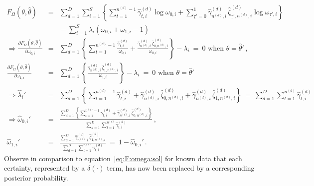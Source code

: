 \documentclass[a4paper]{article}
\newcommand{\ut}{\underline{\tau}}
\begin{document}
\begin{eqnarray}
  F_{\Omega}(\theta,\hat{\theta}) & = & 
\sum_{d=1}^D\sum_{i=1}^{S}\left\{
\sum_{t=1}^{n^{(d)}-1}
\hat{\gamma}_{t,i}^{(d)}\log\omega_{0,i}+
\sum_{\ut'=0}^{1}
\hat{\gamma}^{(d)}_{n^{(d)},i}\,\hat{\zeta}_{\ut',n^{(d)},i}^{(d)}\log\omega_{\ut',i}
\right\}
\nonumber\\&&
{}-\sum_{i=1}^{S}\lambda_i\left(\omega_{0,i}+\omega_{1,i}-1\right)
\\
\Rightarrow
  \frac{\partial F_{\Omega}(\theta,\hat{\theta})}{\partial\omega_{0,i}} & = &
\sum_{d=1}^D\left\{
\sum_{t=1}^{n^{(d)}-1}
\frac{\hat{\gamma}_{t,i}^{(d)}}{\omega_{0,i}}+
\frac{\hat{\gamma}^{(d)}_{n^{(d)},i}\,\hat{\zeta}_{0,n^{(d)},i}^{(d)}}{\omega_{0,i}}
\right\}-\lambda_i~=~0\mbox{ when }\theta=\hat{\theta}'\,,
\nonumber\\
  \frac{\partial F_{\Omega}(\theta,\hat{\theta})}{\partial\omega_{1,i}} & = &
\sum_{d=1}^D\left\{
\frac{\hat{\gamma}^{(d)}_{n^{(d)},i}\,\hat{\zeta}_{1,n^{(d)},i}^{(d)}}{\omega_{1,i}}
\right\}-\lambda_i~=~0\mbox{ when }\theta=\hat{\theta}'
\nonumber\\
\Rightarrow\hat{\lambda}_i' & = & \sum_{d=1}^D\left\{
\sum_{t=1}^{n^{(d)}-1}\hat{\gamma}_{t,i}^{(d)}+\hat{\gamma}^{(d)}_{n^{(d)},i}\,\hat{\zeta}_{0,n^{(d)},i}^{(d)}
+\hat{\gamma}^{(d)}_{n^{(d)},i}\,\hat{\zeta}_{1,n^{(d)},i}^{(d)}\right\}
~=~\sum_{d=1}^D\sum_{t=1}^{n^{(d)}}\hat{\gamma}_{t,i}^{(d)}
\nonumber\\
\Rightarrow \hat{\omega}_{0,i}' & = &
\frac{\sum_{d=1}^D\left\{
           \sum_{t=1}^{n^{(d)}-1}\hat{\gamma}_{t,i}^{(d)}+\hat{\gamma}^{(d)}_{n^{(d)},i}\,\hat{\zeta}_{0,n^{(d)},i}^{(d)}\right\}}
       {\sum_{d=1}^D\sum_{t=1}^{n^{(d)}}\hat{\gamma}_{t,i}^{(d)}}\,,
\nonumber\\
\hat{\omega}_{1,i}' & = & 
\frac{\sum_{d=1}^D\hat{\gamma}^{(d)}_{n^{(d)},i}\,\hat{\zeta}_{1,n^{(d)},i}^{(d)}}
       {\sum_{d=1}^D\sum_{t=1}^{n^{(d)}}\hat{\gamma}_{t,i}^{(d)}}~=~1-\hat{\omega}_{0,i}'\,.
\end{eqnarray}
Observe in comparison to equation~\eqref{eq:F:omega:sol} for known data that each certainty, represented by a $\delta(\cdot)$ term, has now been replaced
by a corresponding posterior probability.

\end{document}
